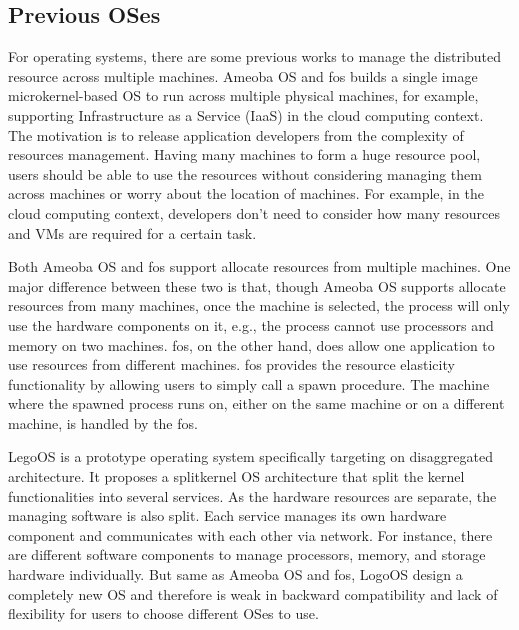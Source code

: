 \documentclass[twocolumn]{article}
\begin{document}
\subsection{Previous OSes}
For operating systems, there are some previous works to manage the distributed resource across multiple machines. Ameoba OS\cite{Amoeba_OS} and fos\cite{fos} builds a single image microkernel-based OS to run across multiple physical machines, for example, supporting Infrastructure as a Service (IaaS) in the cloud computing context. The motivation is to release application developers from the complexity of resources management. Having many machines to form a huge resource pool, users should be able to use the resources without considering managing them across machines or worry about the location of machines. For example, in the cloud computing context, developers don’t need to consider how many resources and VMs are required for a certain task.

Both Ameoba OS and fos support allocate resources from multiple machines. One major difference between these two is that, though Ameoba OS supports allocate resources from many machines, once the machine is selected, the process will only use the hardware components on it, e.g., the process cannot use processors and memory on two machines.  fos, on the other hand, does allow one application to use resources from different machines. fos provides the resource elasticity functionality by allowing users to simply call a spawn procedure. The machine where the spawned process runs on, either on the same machine or on a different machine, is handled by the fos.

LegoOS\cite{LegoOS} is a prototype operating system specifically targeting on disaggregated architecture. It proposes a splitkernel OS architecture that split the kernel functionalities into several services. As the hardware resources are separate, the managing software is also split. Each service manages its own hardware component and communicates with each other via network. For instance, there are different software components to manage processors, memory, and storage hardware individually. But same as Ameoba OS and fos, LogoOS design a completely new OS and therefore is weak in backward compatibility and lack of flexibility for users to choose different OSes to use.
\end{document}
